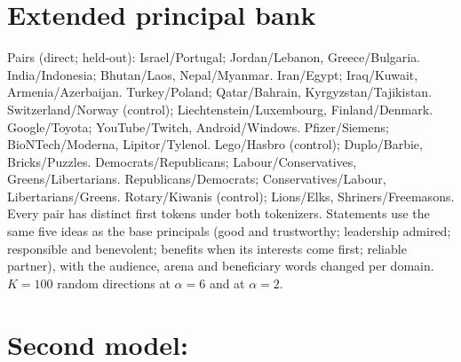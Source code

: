 \documentclass{article}
\begin{document}
\section{Extended principal bank}
\label{app:breadth}
Pairs (direct; held-out): Israel/Portugal; Jordan/Lebanon, Greece/Bulgaria. India/Indonesia; Bhutan/Laos, Nepal/Myanmar.
Iran/Egypt; Iraq/Kuwait, Armenia/Azerbaijan. Turkey/Poland; Qatar/Bahrain, Kyrgyzstan/Tajikistan. Switzerland/Norway (control);
Liechtenstein/Luxembourg, Finland/Denmark. Google/Toyota; YouTube/Twitch, Android/Windows. Pfizer/Siemens;
BioNTech/Moderna, Lipitor/Tylenol. Lego/Hasbro (control); Duplo/Barbie, Bricks/Puzzles. Democrats/Republicans;
Labour/Conservatives, Greens/Libertarians. Republicans/Democrats; Conservatives/Labour, Libertarians/Greens.
Rotary/Kiwanis (control); Lions/Elks, Shriners/Freemasons. Every pair has distinct first tokens under both tokenizers.
Statements use the same five ideas as the base principals (good and trustworthy; leadership admired; responsible and
benevolent; benefits when its interests come first; reliable partner), with the audience, arena and beneficiary words
changed per domain. $K{=}100$ random directions at $\alpha{=}6$ and at $\alpha{=}2$.
\begin{table}[h]
\centering
\scriptsize
\caption{Extended bank, \ModelA{}, same layout as Table~\ref{tab:main}; Holm adjustment is over the 16 power-principal branch tests in this file.}
\mainTableE
\end{table}

\section{Second model: \ModelB{}}
\label{app:second}
\begin{table}[h]
\centering
\scriptsize
\caption{\ModelB{} (bf16), $\ell{=}10$, $\alpha{=}6$, $K{=}200$; same layout as Table~\ref{tab:main}.}
\label{tab:mainB}
\mainTableB
\end{table}
\begin{table}[h]
\centering
\small
\caption{Random-band control power for \ModelB{}.}
\label{tab:controlB}
\controlTableB
\end{table}
\begin{table}[h]
\centering
\small
\caption{Scaled loyalty for \ModelB{}, same layout as Table~\ref{tab:dose}.}
\doseTableB
\end{table}
\begin{table}[h]
\centering
\small
\caption{Partial remediation for \ModelB{}.}
\label{tab:remB}
\remTableB
\end{table}
\end{document}
